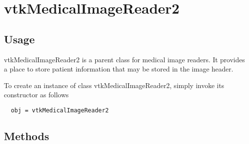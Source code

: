 \section{vtkMedicalImageReader2}

\subsection{Usage}

 vtkMedicalImageReader2 is a parent class for medical image readers.
 It provides a place to store patient information that may be stored
 in the image header.

To create an instance of class vtkMedicalImageReader2, simply
invoke its constructor as follows
\begin{verbatim}
  obj = vtkMedicalImageReader2
\end{verbatim}
\subsection{Methods}

